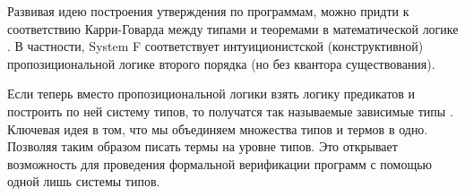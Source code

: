 Развивая идею построения утверждения по программам, можно придти к соответствию Карри-Говарда
между типами и теоремами в математической логике \cite{propositions-as-types}. В частности, System F
соответствует интуиционистской (конструктивной) пропозициональной логике второго порядка
(но без квантора существования).

Если теперь вместо пропозициональной логики взять логику предикатов и построить по ней систему типов,
то получатся так называемые зависимые типы \cite{intuitionistic-theory-of-types}.
Ключевая идея в том, что мы объединяем множества типов и термов в одно. Позволяя таким образом писать
термы на уровне типов. Это открывает возможность для проведения формальной верификации программ с
помощью одной лишь системы типов.
